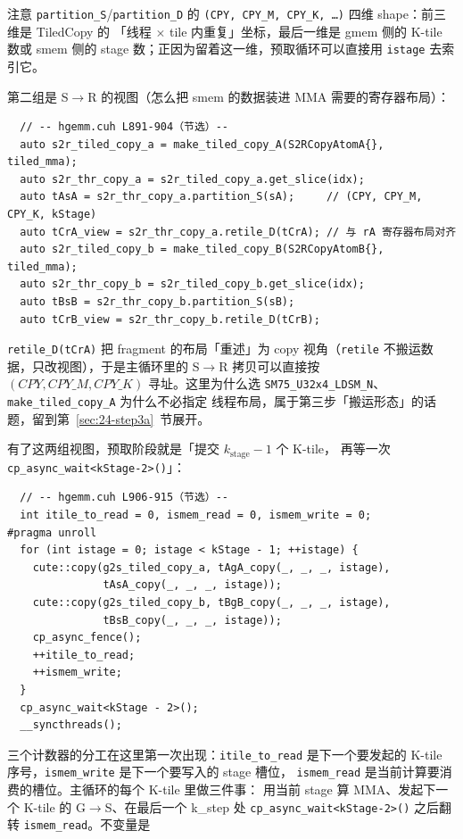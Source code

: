 注意 \texttt{partition\_S}/\texttt{partition\_D} 的
\texttt{(CPY, CPY\_M, CPY\_K, \dots)} 四维 shape：前三维是 TiledCopy 的
「线程 $\times$ tile 内重复」坐标，最后一维是 gmem 侧的 K-tile 数或 smem 侧的
stage 数；正因为留着这一维，预取循环可以直接用 \texttt{istage} 去索引它。

第二组是 S$\to$R 的视图（怎么把 smem 的数据装进 MMA 需要的寄存器布局）：

\begin{lstlisting}
  // -- hgemm.cuh L891-904（节选）--
  auto s2r_tiled_copy_a = make_tiled_copy_A(S2RCopyAtomA{}, tiled_mma);
  auto s2r_thr_copy_a = s2r_tiled_copy_a.get_slice(idx);
  auto tAsA = s2r_thr_copy_a.partition_S(sA);     // (CPY, CPY_M, CPY_K, kStage)
  auto tCrA_view = s2r_thr_copy_a.retile_D(tCrA); // 与 rA 寄存器布局对齐
  auto s2r_tiled_copy_b = make_tiled_copy_B(S2RCopyAtomB{}, tiled_mma);
  auto s2r_thr_copy_b = s2r_tiled_copy_b.get_slice(idx);
  auto tBsB = s2r_thr_copy_b.partition_S(sB);
  auto tCrB_view = s2r_thr_copy_b.retile_D(tCrB);
\end{lstlisting}

\texttt{retile\_\allowbreak{}D\allowbreak{}(t\allowbreak{}Cr\allowbreak{}A)} 把 fragment 的布局「重述」为 copy 视角（\texttt{retile}
不搬运数据，只改视图），于是主循环里的 S$\to$R 拷贝可以直接按
$(CPY, CPY\_M, CPY\_K)$ 寻址。这里为什么选
\texttt{SM75\_\allowbreak{}U32x4\_\allowbreak{}LDSM\_\allowbreak{}N}、\texttt{make\_\allowbreak{}tiled\_\allowbreak{}copy\_\allowbreak{}A} 为什么不必指定
线程布局，属于第三步「搬运形态」的话题，留到第~\ref{sec:24-step3a}~节展开。

有了这两组视图，预取阶段就是「提交 $k_{\mathrm{stage}}-1$ 个 K-tile，
再等一次 \texttt{cp\_\allowbreak{}async\_\allowbreak{}wait\allowbreak{}<k\allowbreak{}Stage-2>\allowbreak{}()}」：

\begin{lstlisting}
  // -- hgemm.cuh L906-915（节选）--
  int itile_to_read = 0, ismem_read = 0, ismem_write = 0;
#pragma unroll
  for (int istage = 0; istage < kStage - 1; ++istage) {
    cute::copy(g2s_tiled_copy_a, tAgA_copy(_, _, _, istage),
               tAsA_copy(_, _, _, istage));
    cute::copy(g2s_tiled_copy_b, tBgB_copy(_, _, _, istage),
               tBsB_copy(_, _, _, istage));
    cp_async_fence();
    ++itile_to_read;
    ++ismem_write;
  }
  cp_async_wait<kStage - 2>();
  __syncthreads();
\end{lstlisting}

三个计数器的分工在这里第一次出现：\texttt{itile\_\allowbreak{}to\_\allowbreak{}read} 是下一个要发起的
K-tile 序号，\texttt{ismem\_write} 是下一个要写入的 stage 槽位，
\texttt{ismem\_read} 是当前计算要消费的槽位。主循环的每个 K-tile 里做三件事：
用当前 stage 算 MMA、发起下一个 K-tile 的 G$\to$S、在最后一个 k\_step 处
\texttt{cp\_\allowbreak{}async\_\allowbreak{}wait\allowbreak{}<k\allowbreak{}Stage-2>\allowbreak{}()} 之后翻转 \texttt{ismem\_read}。不变量是

